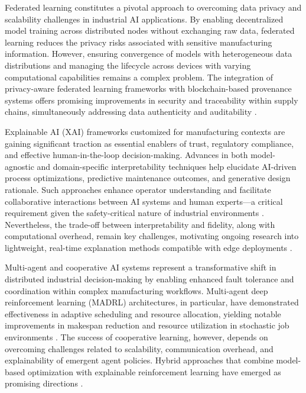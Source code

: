 \documentclass[sigconf]{acmart}
\begin{document}
Federated learning constitutes a pivotal approach to overcoming data privacy and scalability challenges in industrial AI applications. By enabling decentralized model training across distributed nodes without exchanging raw data, federated learning reduces the privacy risks associated with sensitive manufacturing information. However, ensuring convergence of models with heterogeneous data distributions and managing the lifecycle across devices with varying computational capabilities remains a complex problem. The integration of privacy-aware federated learning frameworks with blockchain-based provenance systems offers promising improvements in security and traceability within supply chains, simultaneously addressing data authenticity and auditability \cite{ref6,ref25,ref41}.

Explainable AI (XAI) frameworks customized for manufacturing contexts are gaining significant traction as essential enablers of trust, regulatory compliance, and effective human-in-the-loop decision-making. Advances in both model-agnostic and domain-specific interpretability techniques help elucidate AI-driven process optimizations, predictive maintenance outcomes, and generative design rationale. Such approaches enhance operator understanding and facilitate collaborative interactions between AI systems and human experts—a critical requirement given the safety-critical nature of industrial environments \cite{ref35,ref44}. Nevertheless, the trade-off between interpretability and fidelity, along with computational overhead, remain key challenges, motivating ongoing research into lightweight, real-time explanation methods compatible with edge deployments \cite{ref38}.

Multi-agent and cooperative AI systems represent a transformative shift in distributed industrial decision-making by enabling enhanced fault tolerance and coordination within complex manufacturing workflows. Multi-agent deep reinforcement learning (MADRL) architectures, in particular, have demonstrated effectiveness in adaptive scheduling and resource allocation, yielding notable improvements in makespan reduction and resource utilization in stochastic job environments \cite{ref29}. The success of cooperative learning, however, depends on overcoming challenges related to scalability, communication overhead, and explainability of emergent agent policies. Hybrid approaches that combine model-based optimization with explainable reinforcement learning have emerged as promising directions \cite{ref29,ref37}.
\end{document}
